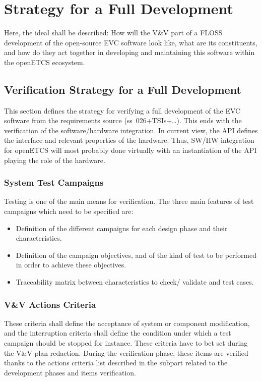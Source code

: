 \documentclass{template/openetcs_report}
\begin{document}
\section{\VV Strategy for a Full Development }
\label{sec:vv-strategy-full}


Here, the ideal shall be described: How will the V\&V part of a FLOSS
development of the open-source EVC software look like, what are its
constituents, and how do they act together in developing and
maintaining this software within the openETCS ecosystem.


\subsection{Verification Strategy for a Full Development}
\label{sec:verif-strategy-full}

This section defines the strategy for verifying a full development of
the EVC software from the requirements source
(ss~026+TSIs+\ldots). This ends with the verification of the
software/hardware integration. In current view, the API defines the
interface and relevant properties of the hardware. Thus, SW/HW
integration for openETCS will most probably done virtually with an
instantiation of the API playing the role of the hardware. 

\subsubsection{System Test Campaigns}
Testing is one of the main means for verification. The three main
features of test campaigns which need to be specified are:
\begin{itemize}
\item Definition of the different campaigns for each design phase and
  their characteristics.
\item Definition of the campaign objectives, and of the kind of test
  to be performed in order to achieve these objectives.
\item Traceability matrix between characteristics to check/ validate
  and test cases.
\end{itemize}

\subsubsection{V\&V Actions Criteria}
These criteria shall define the acceptance of system or component
modification, and the interruption criteria shall define the condition
under which a test campaign should be stopped for instance. These
criteria have to bet set during the V\&V plan redaction.  During the
verification phase, these items are verified thanks to the actions
criteria list described in the subpart related to the development
phases and items verification.
\end{document}
